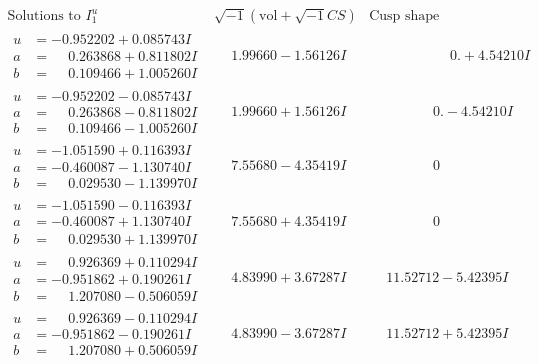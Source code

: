 \documentclass[1p]{elsarticle_modified}
\theoremstyle{definition}
\newcommand{\I}{\sqrt{-1}}
\begin{document}
$$\begin{array}{c|c|c}  
\text{Solutions to }I^u_{1}& \I (\text{vol} + \sqrt{-1}CS) & \text{Cusp shape}\\
 \hline 
\begin{aligned}
u &= -0.952202 + 0.085743 I \\
a &= \phantom{-}0.263868 + 0.811802 I \\
b &= \phantom{-}0.109466 + 1.005260 I\end{aligned}
 & \phantom{-}1.99660 - 1.56126 I & \phantom{-0.000000 -}0. + 4.54210 I \\ \hline\begin{aligned}
u &= -0.952202 - 0.085743 I \\
a &= \phantom{-}0.263868 - 0.811802 I \\
b &= \phantom{-}0.109466 - 1.005260 I\end{aligned}
 & \phantom{-}1.99660 + 1.56126 I & \phantom{-0.000000 } 0. - 4.54210 I \\ \hline\begin{aligned}
u &= -1.051590 + 0.116393 I \\
a &= -0.460087 - 1.130740 I \\
b &= \phantom{-}0.029530 - 1.139970 I\end{aligned}
 & \phantom{-}7.55680 - 4.35419 I & \phantom{-0.000000 } 0 \\ \hline\begin{aligned}
u &= -1.051590 - 0.116393 I \\
a &= -0.460087 + 1.130740 I \\
b &= \phantom{-}0.029530 + 1.139970 I\end{aligned}
 & \phantom{-}7.55680 + 4.35419 I & \phantom{-0.000000 } 0 \\ \hline\begin{aligned}
u &= \phantom{-}0.926369 + 0.110294 I \\
a &= -0.951862 + 0.190261 I \\
b &= \phantom{-}1.207080 - 0.506059 I\end{aligned}
 & \phantom{-}4.83990 + 3.67287 I & \phantom{-}11.52712 - 5.42395 I \\ \hline\begin{aligned}
u &= \phantom{-}0.926369 - 0.110294 I \\
a &= -0.951862 - 0.190261 I \\
b &= \phantom{-}1.207080 + 0.506059 I\end{aligned}
 & \phantom{-}4.83990 - 3.67287 I & \phantom{-}11.52712 + 5.42395 I \\ \hline\begin{aligned}

\end{aligned}
\end{array}$$
\end{document}
